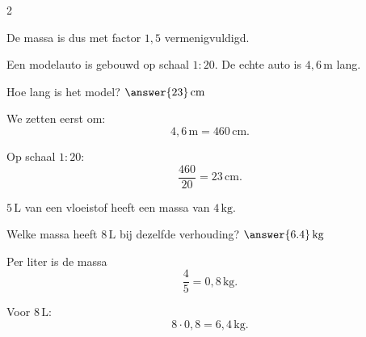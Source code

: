 \documentclass{ximera}
\begin{document}
\begin{oefening}[Verhoudingen]{\oefB}
\begin{multicols}{2}
\begin{question}
\begin{oplossing}
    De massa is dus met factor $1{,}5$ vermenigvuldigd.
    \end{oplossing}
    \end{question}
    
    
    \begin{question}
    Een modelauto is gebouwd op schaal $1:20$.
    De echte auto is $4{,}6\,\mathrm m$ lang.
    
    Hoe lang is het model? $\answer{23}\,\mathrm{cm}$
    
    \begin{oplossing}
    We zetten eerst om:
    \[
    4{,}6\,\mathrm m=460\,\mathrm{cm}.
    \]
    
    Op schaal $1:20$:
    \[
    \dfrac{460}{20}=23\,\mathrm{cm}.
    \]
    \end{oplossing}
    \end{question}
    
    
    \begin{question}
    $5\,\mathrm L$ van een vloeistof heeft een massa van $4\,\mathrm{kg}$.
    
    Welke massa heeft $8\,\mathrm L$ bij dezelfde verhouding? $\answer{6.4}\,\mathrm{kg}$
    
    \begin{oplossing}
    Per liter is de massa
    \[
    \dfrac45=0{,}8\,\mathrm{kg}.
    \]
    
    Voor $8\,\mathrm L$:
    \[
    8\cdot0{,}8
    =6{,}4\,\mathrm{kg}.
    \]
    \end{oplossing}
    \end{question}
    
    \end{multicols}
    
    \end{oefening}
    
    
    
\end{document}
